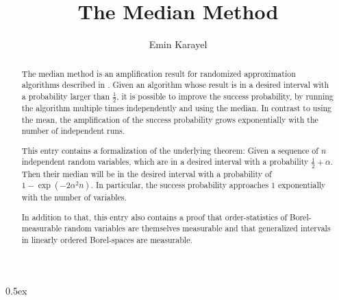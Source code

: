 \documentclass[11pt,a4paper]{article}
\begin{document}
\title{The Median Method}
\author{Emin Karayel}
\maketitle
\begin{abstract}
The median method is an amplification result for randomized approximation algorithms described in \cite{alon1999}.
Given an algorithm whose result is in a desired interval with a probability larger than
$\frac{1}{2}$, it is possible to improve the success probability, by running the algorithm multiple
times independently and using the median. In contrast to using the mean, the amplification of the
success probability grows exponentially with the number of independent runs.

This entry contains a formalization of the underlying theorem:
Given a sequence of $n$ independent random variables, which are in a desired interval with a
probability $\frac{1}{2} + \alpha$. Then their median will be in the desired interval with a
probability of $1 - \exp (-2 \alpha^2 n)$. In particular, the success probability approaches $1$
exponentially with the number of variables.

In addition to that, this entry also contains a proof that order-statistics of Borel-measurable
random variables are themselves measurable and that generalized intervals in linearly ordered 
Borel-spaces are measurable.
\end{abstract}
\tableofcontents

\parindent 0pt\parskip 0.5ex





\end{document}
